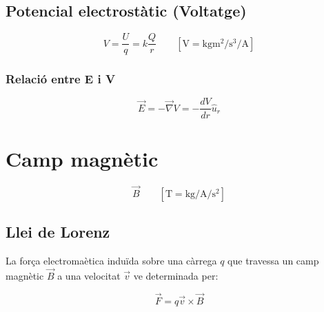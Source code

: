 \subsection{Potencial electrostàtic (Voltatge)}
\label{sub:potencial_electrostatic_voltatge_}

\begin{multicols}{2}

    \begin{equation}
        V = \frac{U}{q} = k \frac{Q}{r} \qquad \left[\si{\volt} = \si{\kilo\gram\metre\squared\per\second\cubed\per\ampere} \right]
    \end{equation}

    \subsubsection{Relació entre E i V}
    \label{ssub:relaci_entre_e_i_v}

    \begin{equation}
        \vec{E} = - \vec{\nabla} V = - \frac{dV}{dr} \hat{u}_r
    \end{equation}


\end{multicols}




\section{Camp magnètic}
\label{sec:camp_magnetic}

\begin{equation}
    \vec{B} \qquad \left[ \si{\tesla} = \si{\kilo\gram\per\ampere\per\second\squared}\right]
\end{equation}

\subsection{Llei de Lorenz}
\label{sub:llei_de_lorenz}

La força electromaètica induïda sobre una càrrega $q$ que travessa un camp magnètic $\vec{B}$ a una velocitat $\vec{v}$ ve determinada per:

\begin{equation}
    \vec{F} = q\vec{v}\times \vec{B}
\end{equation}


